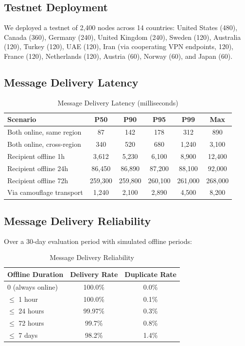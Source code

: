 \documentclass[11pt,a4paper]{article}
\begin{document}
\subsection{Testnet Deployment}

We deployed a testnet of 2{,}400 nodes across 14 countries: United States (480), Canada (360), Germany (240), United Kingdom (240), Sweden (120), Australia (120), Turkey (120), UAE (120), Iran (via cooperating VPN endpoints, 120), France (120), Netherlands (120), Austria (60), Norway (60), and Japan (60).

\subsection{Message Delivery Latency}

\begin{table}[H]
\centering
\caption{Message Delivery Latency (milliseconds)}
\label{tab:latency}
\begin{tabular}{lccccc}
\toprule
\textbf{Scenario} & \textbf{P50} & \textbf{P90} & \textbf{P95} & \textbf{P99} & \textbf{Max} \\
\midrule
Both online, same region & 87 & 142 & 178 & 312 & 890 \\
Both online, cross-region & 340 & 520 & 680 & 1{,}240 & 3{,}100 \\
Recipient offline 1h & 3{,}612 & 5{,}230 & 6{,}100 & 8{,}900 & 12{,}400 \\
Recipient offline 24h & 86{,}450 & 86{,}890 & 87{,}200 & 88{,}100 & 92{,}000 \\
Recipient offline 72h & 259{,}300 & 259{,}800 & 260{,}100 & 261{,}000 & 268{,}000 \\
Via camouflage transport & 1{,}240 & 2{,}100 & 2{,}890 & 4{,}500 & 8{,}200 \\
\bottomrule
\end{tabular}
\end{table}

\subsection{Message Delivery Reliability}

Over a 30-day evaluation period with simulated offline periods:

\begin{table}[H]
\centering
\caption{Message Delivery Reliability}
\label{tab:reliability}
\begin{tabular}{lcc}
\toprule
\textbf{Offline Duration} & \textbf{Delivery Rate} & \textbf{Duplicate Rate} \\
\midrule
0 (always online) & 100.0\% & 0.0\% \\
$\leq$ 1 hour & 100.0\% & 0.1\% \\
$\leq$ 24 hours & 99.97\% & 0.3\% \\
$\leq$ 72 hours & 99.7\% & 0.8\% \\
$\leq$ 7 days & 98.2\% & 1.4\% \\
\bottomrule
\end{tabular}
\end{table}
\end{document}
